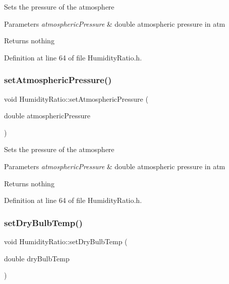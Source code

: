 Sets the pressure of the atmosphere


\begin{DoxyParams}{Parameters}
{\em atmospheric\+Pressure} & double atmospheric pressure in atm\\
\hline
\end{DoxyParams}
\begin{DoxyReturn}{Returns}
nothing 
\end{DoxyReturn}


Definition at line 64 of file Humidity\+Ratio.\+h.

\mbox{\label{class_humidity_ratio_aebab92be0c5eb4f23baaeb7268dad87e}} 
\subsubsection{\texorpdfstring{set\+Atmospheric\+Pressure()}{setAtmosphericPressure()}\hspace{0.1cm}{\footnotesize\ttfamily [3/3]}}
{\footnotesize\ttfamily void Humidity\+Ratio\+::set\+Atmospheric\+Pressure (\begin{DoxyParamCaption}\item[{double}]{atmospheric\+Pressure }\end{DoxyParamCaption})\hspace{0.3cm}{\ttfamily [inline]}}

Sets the pressure of the atmosphere


\begin{DoxyParams}{Parameters}
{\em atmospheric\+Pressure} & double atmospheric pressure in atm\\
\hline
\end{DoxyParams}
\begin{DoxyReturn}{Returns}
nothing 
\end{DoxyReturn}


Definition at line 64 of file Humidity\+Ratio.\+h.

\mbox{\label{class_humidity_ratio_a291bccce6b8665412987a31bd2633d9a}} 
\subsubsection{\texorpdfstring{set\+Dry\+Bulb\+Temp()}{setDryBulbTemp()}\hspace{0.1cm}{\footnotesize\ttfamily [1/3]}}
{\footnotesize\ttfamily void Humidity\+Ratio\+::set\+Dry\+Bulb\+Temp (\begin{DoxyParamCaption}\item[{double}]{dry\+Bulb\+Temp }\end{DoxyParamCaption})\hspace{0.3cm}{\ttfamily [inline]}}

